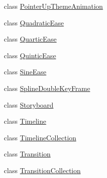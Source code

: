 \begin{DoxyCompactItemize}
\item 
class \hyperlink{class_windows_1_1_u_i_1_1_xaml_1_1_media_1_1_animation_1_1_pointer_up_theme_animation}{Pointer\+Up\+Theme\+Animation}
\item 
class \hyperlink{class_windows_1_1_u_i_1_1_xaml_1_1_media_1_1_animation_1_1_quadratic_ease}{Quadratic\+Ease}
\item 
class \hyperlink{class_windows_1_1_u_i_1_1_xaml_1_1_media_1_1_animation_1_1_quartic_ease}{Quartic\+Ease}
\item 
class \hyperlink{class_windows_1_1_u_i_1_1_xaml_1_1_media_1_1_animation_1_1_quintic_ease}{Quintic\+Ease}
\item 
class \hyperlink{class_windows_1_1_u_i_1_1_xaml_1_1_media_1_1_animation_1_1_sine_ease}{Sine\+Ease}
\item 
class \hyperlink{class_windows_1_1_u_i_1_1_xaml_1_1_media_1_1_animation_1_1_spline_double_key_frame}{Spline\+Double\+Key\+Frame}
\item 
class \hyperlink{class_windows_1_1_u_i_1_1_xaml_1_1_media_1_1_animation_1_1_storyboard}{Storyboard}
\item 
class \hyperlink{class_windows_1_1_u_i_1_1_xaml_1_1_media_1_1_animation_1_1_timeline}{Timeline}
\item 
class \hyperlink{class_windows_1_1_u_i_1_1_xaml_1_1_media_1_1_animation_1_1_timeline_collection}{Timeline\+Collection}
\item 
class \hyperlink{class_windows_1_1_u_i_1_1_xaml_1_1_media_1_1_animation_1_1_transition}{Transition}
\item 
class \hyperlink{class_windows_1_1_u_i_1_1_xaml_1_1_media_1_1_animation_1_1_transition_collection}{Transition\+Collection}
\end{DoxyCompactItemize}
